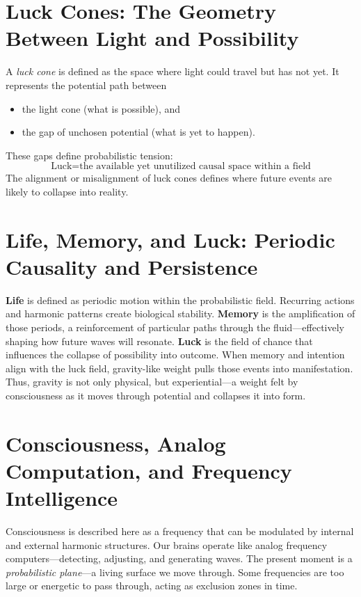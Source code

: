 \documentclass[12pt]{article}
\begin{document}
\section{Luck Cones: The Geometry Between Light and Possibility}
A \emph{luck cone} is defined as the space where light could travel but has not yet. It represents the potential path between
\begin{itemize}
    \item the light cone (what is possible), and
    \item the gap of unchosen potential (what is yet to happen).
\end{itemize}
These gaps define probabilistic tension:
\begin{equation}
    \text{Luck} = \text{the available yet unutilized causal space within a field}
\end{equation}
The alignment or misalignment of luck cones defines where future events are likely to collapse into reality.

\section{Life, Memory, and Luck: Periodic Causality and Persistence}
\textbf{Life} is defined as periodic motion within the probabilistic field. Recurring actions and harmonic patterns create biological stability. \textbf{Memory} is the amplification of those periods, a reinforcement of particular paths through the fluid---effectively shaping how future waves will resonate. \textbf{Luck} is the field of chance that influences the collapse of possibility into outcome. When memory and intention align with the luck field, gravity-like weight pulls those events into manifestation. Thus, gravity is not only physical, but experiential---a weight felt by consciousness as it moves through potential and collapses it into form.

\section{Consciousness, Analog Computation, and Frequency Intelligence}
Consciousness is described here as a frequency that can be modulated by internal and external harmonic structures. Our brains operate like analog frequency computers---detecting, adjusting, and generating waves. The present moment is a \emph{probabilistic plane}---a living surface we move through. Some frequencies are too large or energetic to pass through, acting as exclusion zones in time.
\end{document}
